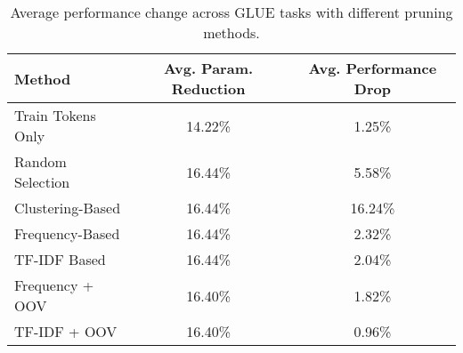 \documentclass[twocolumn]{article}
\begin{document}
\begin{table}[ht!]
\centering
\caption{Average performance change across GLUE tasks with different pruning methods.}
\label{tab:avg_performance}
\begin{tabular}{lcc}
\toprule
\textbf{Method} & \textbf{Avg. Param. Reduction} & \textbf{Avg. Performance Drop} \\
\midrule
Train Tokens Only & 14.22\% & 1.25\% \\
Random Selection & 16.44\% & 5.58\% \\
Clustering-Based & 16.44\% & 16.24\% \\
Frequency-Based & 16.44\% & 2.32\% \\
TF-IDF Based & 16.44\% & 2.04\% \\
Frequency + OOV & 16.40\% & 1.82\% \\
TF-IDF + OOV & 16.40\% & 0.96\% \\
\bottomrule
\end{tabular}
\end{table}
\end{document}
